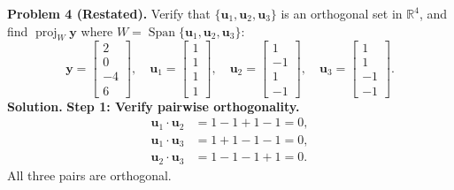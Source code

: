 \documentclass[11pt, letterpaper]{article}
\theoremstyle{definition}
\theoremstyle{remark}
\newcommand{\R}{\mathbb{R}}
\begin{document}
\medskip
\textbf{Problem 4 (Restated).} Verify that $\{\mathbf{u}_1, \mathbf{u}_2, \mathbf{u}_3\}$ is an orthogonal set in $\R^4$, and find $\operatorname{proj}_W \mathbf{y}$ where $W = \operatorname{Span}\{\mathbf{u}_1, \mathbf{u}_2, \mathbf{u}_3\}$:
\[
\mathbf{y} = \begin{bmatrix} 2 \\ 0 \\ -4 \\ 6 \end{bmatrix}, \quad \mathbf{u}_1 = \begin{bmatrix} 1 \\ 1 \\ 1 \\ 1 \end{bmatrix}, \quad \mathbf{u}_2 = \begin{bmatrix} 1 \\ -1 \\ 1 \\ -1 \end{bmatrix}, \quad \mathbf{u}_3 = \begin{bmatrix} 1 \\ 1 \\ -1 \\ -1 \end{bmatrix}.
\]
\textbf{Solution.}
\textbf{Step 1: Verify pairwise orthogonality.}
\begin{align*}
\mathbf{u}_1 \cdot \mathbf{u}_2 &= 1 - 1 + 1 - 1 = 0, \\
\mathbf{u}_1 \cdot \mathbf{u}_3 &= 1 + 1 - 1 - 1 = 0, \\
\mathbf{u}_2 \cdot \mathbf{u}_3 &= 1 - 1 - 1 + 1 = 0.
\end{align*}
All three pairs are orthogonal.
\end{document}
